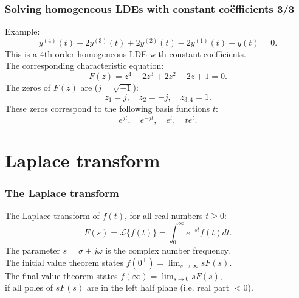 \begin{frame}
\frametitle{Solving homogeneous LDEs with constant coëfficients 3/3}
Example:
\begin{equation*}
y^{(4)}(t) - 2 y^{(3)}(t) + 2 y^{(2)}(t) - 2 y^{(1)}(t) + y(t) = 0.
\end{equation*}
This is a 4th order homogeneous LDE with constant coëfficients.\\
The corresponding characteristic equation:
\begin{equation*}
F(z) = z^4 - 2z^3 + 2z^2 - 2 z + 1 = 0.
\end{equation*}
The zeros of $F(z)$ are ($j=\sqrt{-1}$):
\begin{equation*}
z_1 = j, \quad z_2 = -j, \quad z_{3, 4} = 1.
\end{equation*}
These zeros correspond to the following basis functions $t$:
\begin{equation*}
 e^{jt}, \quad e^{-jt}, \quad e^t, \quad te^t.
\end{equation*}
\end{frame}

\section{Laplace transform}

\begin{frame}
\frametitle{The Laplace transform}
The Laplace transform of $f(t)$, for all real numbers $t\geq 0$:
\begin{equation*}
F(s) = \mathcal{L}\big\{f(t)\big\} = \int_0^\infty e^{-st} f(t) dt.
\end{equation*}
The parameter $s = \sigma + j\omega$ is the complex number frequency.\\
The initial value theorem states $f(0^+) = \lim_{s\rightarrow\infty} sF(s)$. \\
The final value theorem states $f(\infty) = \lim_{s\rightarrow0} sF(s)$, \\
if all poles of $sF(s)$ are in the left half plane (i.e. real part $<0$).
\end{frame}

